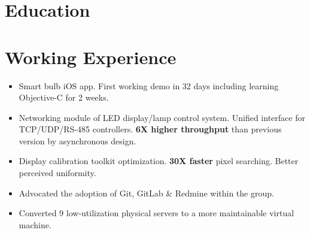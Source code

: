\documentclass[10pt,a4paper]{moderncv/moderncv}
\begin{document}
\maketitle



\section{Education}

\section{Working Experience}
{
\begin{itemize}
	\item Smart bulb iOS app. First working demo in 32 days including learning Objective-C for 2 weeks.
	\item Networking module of LED display/lamp control system. Unified interface for TCP/UDP/RS-485 controllers. \textbf{6X higher throughput} than previous version by asynchronous design.
	\item Display calibration toolkit optimization. \textbf{30X faster} pixel searching. Better perceived uniformity.
	\item Advocated the adoption of Git, GitLab \& Redmine within the group.
	\item Converted 9 low-utilization physical servers to a more maintainable virtual machine.
\end{itemize}
}
\end{document}
